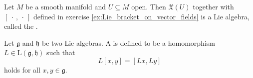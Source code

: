 \begin{example}
	Let $M$ be a smooth manifold and $U \subseteq M$ open. Then $\mathfrak{X}(U)$ together with $[\>\cdot\>,\>\cdot\>]$ defined in exercise \ref{ex:Lie_bracket_on_vector_fields} is a Lie algebra, called the .
\end{example}

\begin{definition}
	Let $\mathfrak{g}$ and $\mathfrak{h}$ be two Lie algebras. A  is defined to be a homomorphism $L \in \mathrm{L}(\mathfrak{g},\mathfrak{h})$ such that
	\begin{equation*}
		L[x,y] = [Lx,Ly]
	\end{equation*}
	\noindent holds for all $x,y \in \mathfrak{g}$.
\end{definition}


